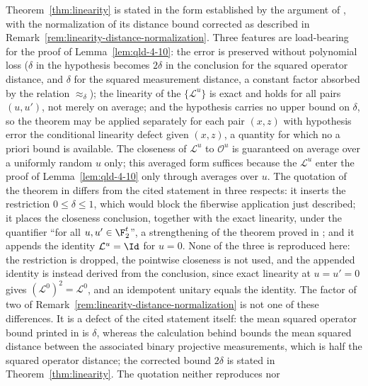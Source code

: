 \begin{remark}
	\label{rem:linearity-import}
	Theorem~\ref{thm:linearity} is stated in the form established by the
	argument of \cite{Natarajan2017Linearity}, with the normalization of its
	distance bound corrected as described in
	Remark~\ref{rem:linearity-distance-normalization}. Three features are
	load-bearing for the proof of Lemma~\ref{lem:qld-4-10}: the error is
	preserved without polynomial loss ($\delta$ in the hypothesis becomes
	$2\delta$ in the conclusion for the squared operator distance, and
	$\delta$ for the squared measurement distance, a constant factor absorbed
	by the relation $\approx_\delta$); the linearity of the
	$\{\mathcal{L}^u\}$ is exact and holds for all pairs $(u,u')$, not merely
	on average; and the hypothesis carries no upper bound on $\delta$, so the
	theorem may be applied separately for each pair $(x,z)$ with hypothesis
	error the conditional linearity defect given $(x,z)$, a quantity for
	which no a priori bound is available. The closeness of $\mathcal{L}^u$ to
	$\mathcal{O}^u$ is guaranteed on average over a uniformly random $u$
	only; this averaged form suffices because the $\mathcal{L}^u$ enter
	the proof of Lemma~\ref{lem:qld-4-10} only through averages over $u$.
	The quotation of the theorem in \cite{Ji2020MIPStar} differs from the
	cited statement in three respects: it inserts the restriction
	$0 \le \delta \le 1$, which would block the fiberwise application
	just described; it places the closeness conclusion, together with the
	exact linearity, under the quantifier ``for all $u, u' \in \F_2^t$'',
	a strengthening of the theorem proved in
	\cite{Natarajan2017Linearity}; and it appends the identity
	$\mathcal{L}^u = \Id$ for $u = 0$. None of the three is
	reproduced here: the restriction is dropped, the pointwise closeness
	is not used, and the appended identity is instead derived from the
	conclusion, since exact linearity at $u = u' = 0$ gives
	$(\mathcal{L}^0)^2 = \mathcal{L}^0$, and an idempotent unitary equals
	the identity. The factor of two of
	Remark~\ref{rem:linearity-distance-normalization} is not one of these
	differences. It is a defect of the cited statement itself: the mean
	squared operator bound printed in
	\cite[Theorem~10]{Natarajan2017Linearity} is $\delta$, whereas the
	calculation behind \cite[equation~(3)]{Natarajan2017Linearity} bounds
	the mean squared distance between the associated binary projective
	measurements, which is half the squared operator distance; the
	corrected bound $2\delta$ is stated in
	Theorem~\ref{thm:linearity}. The quotation neither reproduces nor

\end{remark}
